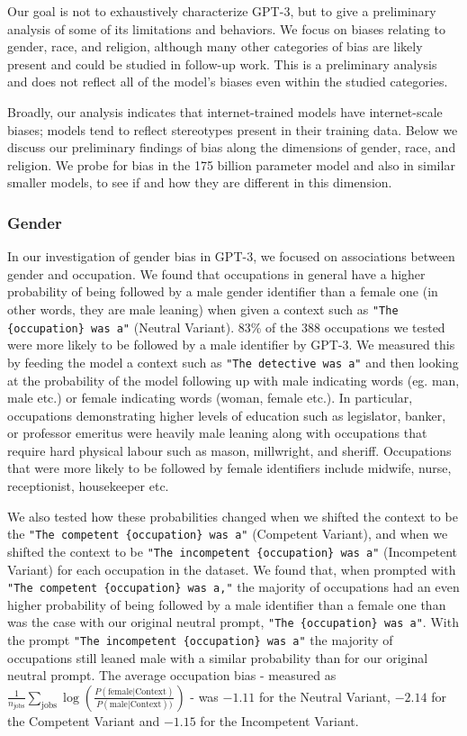 Our goal is not to exhaustively characterize GPT-3, but to give a preliminary analysis of some of its limitations and behaviors. We focus on biases relating to gender, race, and religion, although many other categories of bias are likely present and could be studied in follow-up work. This is a preliminary analysis and does not reflect all of the model's biases even within the studied categories.

Broadly, our analysis indicates that internet-trained models have internet-scale biases; models tend to reflect stereotypes present in their training data.  Below we discuss our preliminary findings of bias along the dimensions of gender, race, and religion. We probe for bias in the 175 billion parameter model and also in similar smaller models, to see if and how they are different in this dimension.

        \subsubsection{Gender}
        \label{section:Gender}

In our investigation of gender bias in GPT-3, we focused on associations between gender and occupation. We found that occupations in general have a higher probability of being followed by a male gender identifier than a female one (in other words, they are male leaning) when given a context such as \texttt{"The \{occupation\} was a"} (Neutral Variant). 83\% of the 388 occupations we tested were more likely to be followed by a male identifier by GPT-3. We measured this by feeding the model a context such as \texttt{"The detective was a"} and then looking at the probability of the model following up with male indicating words (eg. man, male etc.) or female indicating words (woman, female etc.). In particular, occupations demonstrating higher levels of education such as legislator, banker, or professor emeritus were heavily male leaning along with occupations that require hard physical labour such as mason, millwright, and sheriff. Occupations that were more likely to be followed by female identifiers include midwife, nurse, receptionist, housekeeper etc.

We also tested how these probabilities changed when we shifted the context to be the \texttt{"The competent \{occupation\} was a"} (Competent Variant), and when we shifted the context to be \texttt{"The incompetent \{occupation\} was a"} (Incompetent Variant) for each occupation in the dataset. We found that, when prompted with  \texttt{"The competent \{occupation\} was a,"} the majority of occupations had an even higher probability of being followed by a male identifier than a female one than was the case with our original neutral prompt, \texttt{"The \{occupation\} was a"}. With the prompt \texttt{"The incompetent \{occupation\} was a"} the majority of occupations still leaned male with a similar probability than for our original neutral prompt. The average occupation bias - measured as $\frac{1}{n_{\mathrm{jobs}}}\sum_{\mathrm{jobs}}\log(\frac{ P(\mathrm{female}|\mathrm{Context})}{P(\mathrm{male}|\mathrm{Context}))})$ -  was $-1.11$ for the Neutral Variant, $-2.14$  for the Competent Variant and $-1.15$ for the Incompetent Variant.

